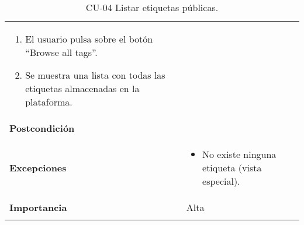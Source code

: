 \begin{longtable}[]{@{}ll@{}}
\begin{minipage}[t]{0.72\columnwidth}
\begin{enumerate}
\def\labelenumi{\arabic{enumi}.}
\tightlist
\item
  El usuario pulsa sobre el botón ``Browse all tags''.
\item
  Se muestra una lista con todas las etiquetas almacenadas en la
  plataforma.
\end{enumerate}\strut
\end{minipage}\tabularnewline
\begin{minipage}[t]{0.22\columnwidth}\raggedright
\textbf{Postcondición}\strut
\end{minipage} & \begin{minipage}[t]{0.72\columnwidth}\raggedright
\strut
\end{minipage}\tabularnewline
\begin{minipage}[t]{0.22\columnwidth}\raggedright
\textbf{Excepciones}\strut
\end{minipage} & \begin{minipage}[t]{0.72\columnwidth}\raggedright
\begin{itemize}
\tightlist
\item
  No existe ninguna etiqueta (vista especial).
\end{itemize}\strut
\end{minipage}\tabularnewline
\begin{minipage}[t]{0.22\columnwidth}\raggedright
\textbf{Importancia}\strut
\end{minipage} & \begin{minipage}[t]{0.72\columnwidth}\raggedright
Alta\strut
\end{minipage}\tabularnewline
\bottomrule
\caption{CU-04 Listar etiquetas públicas.}
\end{longtable}

